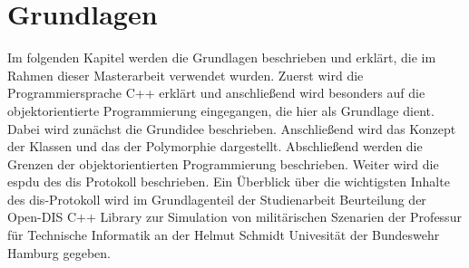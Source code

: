 \chapter{Grundlagen}

Im folgenden Kapitel werden die Grundlagen beschrieben und erklärt, die im Rahmen dieser Masterarbeit verwendet wurden. Zuerst wird die Programmiersprache C++ erklärt und anschließend wird besonders auf die objektorientierte Programmierung eingegangen, die hier als Grundlage dient. Dabei wird zunächst die Grundidee beschrieben. Anschließend wird das Konzept der Klassen und das der Polymorphie dargestellt. Abschließend werden die Grenzen der objektorientierten Programmierung beschrieben.  Weiter wird  die \ac{espdu} des \ac{dis} Protokoll beschrieben. Ein Überblick über die wichtigsten Inhalte des \ac{dis}-Protokoll wird im Grundlagenteil der Studienarbeit \glqq Beurteilung der Open-DIS C++ Library zur Simulation von militärischen Szenarien \grqq{} der Professur für Technische Informatik an der Helmut Schmidt Univesität der Bundeswehr Hamburg gegeben.


